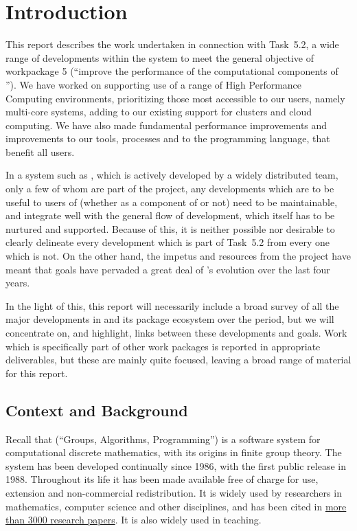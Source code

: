 
\section{Introduction}
This report describes the work undertaken in connection with Task~5.2,
  a wide range of developments within the \GAP system to meet the
  general objective of workpackage 5 (``improve the performance of the
  computational components of \ODK''). We have worked on supporting
  use of a range of High Performance Computing environments,
  prioritizing those most accessible to our users, namely multi-core
  systems, adding to our existing support for clusters and cloud
  computing. We have also made fundamental performance improvements
  and improvements to our tools, processes and to the programming
  language, that benefit all \GAP users.

In a system such as \GAP, which is actively developed by a widely
distributed team, only a few of whom are part of the \ODK project, any
developments which are to be useful to users of \GAP (whether as a component of
\ODK or not) need to be maintainable, and
integrate well with the general flow of \GAP development, which itself
has to be nurtured and supported. Because of this, it is neither
possible nor desirable to clearly delineate every development which
is part of Task~5.2 from every one which is not. On the other hand,
the impetus and resources from the \ODK project have meant that \ODK
goals have pervaded a great deal of \GAP's evolution over the last
four years.

In the light of this, this report will necessarily include  a broad
survey of all the major developments in \GAP and its package ecosystem
over the period, but we will concentrate on, and highlight, links between
these developments and \ODK goals. Work which is specifically part of
other work packages is reported in appropriate deliverables, but these
are mainly quite focused, leaving a broad range of material for this report.

\subsection{Context and Background}

Recall that \GAP (``Groups, Algorithms, Programming'') is a software system for
computational discrete mathematics, with its origins in finite group
theory. The system has been developed continually since 1986, with the
first public release in 1988. Throughout its life it has been made
available free of charge for use, extension and non-commercial
redistribution. It is widely used by researchers in mathematics,
computer science and other disciplines, and has been cited in
\href{https://www.gap-system.org/Doc/Bib/bib.html}{more than 3000
  research papers}. It is also widely used in teaching.

